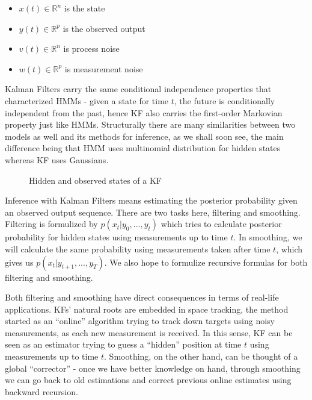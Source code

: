 \begin{itemize}
   \item $x(t) \in \mathbb{R}^n$ is the state
   \item $y(t) \in \mathbb{R}^p$ is the observed output
   \item $v(t) \in \mathbb{R}^n$ is process noise
   \item $w(t) \in \mathbb{R}^p$ is measurement noise
\end{itemize}

Kalman Filters carry the same conditional independence properties that
characterized HMMs - given a state for time $t$, the future is conditionally
independent from the past, hence KF also carries the first-order Markovian
property just like HMMs. Structurally there are many similarities between two
models as well and its methods for inference, as we shall soon see, the main
difference being that HMM uses multinomial distribution for hidden states
whereas KF uses Gaussians.

\begin{figure}[!hbp]
\caption{Hidden and observed states of a KF}
\end{figure}

Inference with Kalman Filters means estimating the posterior probability given
an observed output sequence. There are two tasks here, filtering and
smoothing. Filtering is formulized by $p(x_t|y_0,...,y_t)$ which tries to
calculate posterior probability for hidden states using measurements up to time
$t$. In smoothing, we will calculate the same probability using measurements
taken after time $t$, which gives us $p(x_t|y_{t+1},...,y_T)$. We also hope to
formulize recursive formulas for both filtering and smoothing.

Both filtering and smoothing have direct consequences in terms of real-life
applications. KFs' natural roots are embedded in space tracking, the method
started as an ``online'' algorithm trying to track down targets using noisy
measurements, as each new measurement is received. In this sense, KF can be seen
as an estimator trying to guess a ``hidden'' position at time $t$ using
measurements up to time $t$. Smoothing, on the other hand, can be thought of a
global ``corrector'' - once we have better knowledge on hand, through smoothing
we can go back to old estimations and correct previous online estimates using
backward recursion.


